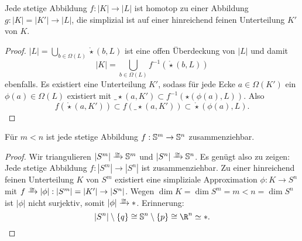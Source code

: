 \begin{st}
	Jede stetige Abbildung $f: |K| \to |L|$ ist homotop zu einer Abbildung $g: |K| = |K'| \to |L|$, die simplizial ist auf einer hinreichend feinen Unterteilung $K'$ von $K$.
	\begin{proof}
		$|L| = \bigcup_{b\in \Omega(L)} \mathring\star(b,L)$ ist eine offen Überdeckung von $|L|$ und damit
		\[
			|K| = \bigcup_{b\in\Omega(L)} f^{-1}(\mathring\star(b,L))
		\]
		ebenfalls.
		Es existiert eine Unterteilung $K'$, sodass für jede Ecke $a \in \Omega(K')$ ein $\phi(a) \in \Omega(L)$ existiert mit $\_\star(a, K') \subset f^{-1}(\star(\phi(a),L))$.
		Also
		\[
			f(\mathring \star(a,K'))
			\subset f(\_\star(a,K'))
			\subset \mathring\star(\phi(a),L).
		\]
	\end{proof}
\end{st}

\begin{st}
	Für $m < n$ ist jede stetige Abbildung $f: \S^m \to \S^n$ zusammenziehbar.
	\begin{proof}
		Wir triangulieren $|S^m| \homto \S^m$ und $|S^n| \homto \S^n$.
		Es genügt also zu zeigen: Jede stetige Abbildung $f: |S^m| \to |S^n|$ ist zusammenziehbar.
		Zu einer hinreichend feinen Unterteilung $K$ von $S^m$ existiert eine simpliziale Approximation $\phi: K \to S^n$ mit $f \homto |\phi|: |S^m| = |K'| \to |S^n|$.
		Wegen $\dim K = \dim S^m = m < n = \dim S^n$ ist $|\phi|$ nicht surjektiv, somit $|\phi| \homto *$.
		Erinnerung:
		\[
			|S^n| \setminus \{q\} \homeomorphic \S^n \setminus \{p\} \homeomorphic \R^n \homotopic *.
		\]
	\end{proof}
\end{st}
